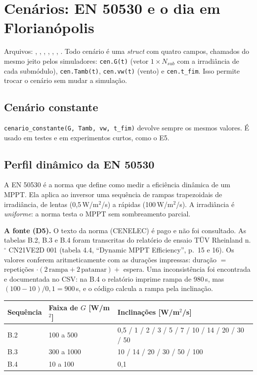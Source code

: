 \section{Cen\'arios: EN 50530 e o dia em Florian\'opolis}\label{sec:cenarios}

Arquivos: , , , , ,
, . Todo cen\'ario \'e uma \emph{struct} com quatro campos, chamados do mesmo jeito pelos simuladores:
\texttt{cen.G(t)} (vetor $1\times N_{sub}$ com a irradi\^ancia de cada subm\'odulo), \texttt{cen.Tamb(t)}, \texttt{cen.vw(t)} (vento) e \texttt{cen.t\_fim}. Isso permite trocar o cen\'ario sem mudar a simula\c{c}\~ao.

\subsection{Cen\'ario constante}

\texttt{cenario\_constante(G, Tamb, vw, t\_fim)} devolve sempre os mesmos valores. \'E usado em testes e em experimentos curtos, como o E5.

\subsection{Perfil din\^amico da EN 50530}

A EN 50530 \'e a norma que define como medir a efici\^encia din\^amica de um MPPT. Ela aplica ao inversor uma sequ\^encia de rampas trapezoidais de irradi\^ancia, de lentas
(0,5\,W/m$^2$/s) a r\'apidas (100\,W/m$^2$/s). A irradi\^ancia \'e \emph{uniforme}: a norma testa o MPPT sem sombreamento parcial.

\textbf{A fonte (D5).} O texto da norma (CENELEC) \'e pago e n\~ao foi consultado. As tabelas B.2, B.3 e B.4 foram transcritas do relat\'orio de ensaio T\"UV Rheinland
n.$^\circ$ CN21VE2D 001 (tabela 4.4, ``Dynamic MPPT Efficiency'', p.~15 e 16). Os valores conferem aritmeticamente com as dura\c{c}\~oes impressas:
dura\c{c}\~ao $=$ repeti\c{c}\~oes $\cdot(2\,\text{rampa}+2\,\text{patamar})+$ espera. Uma inconsist\^encia foi encontrada e documentada no CSV: na B.4 o relat\'orio imprime rampa de 980\,s, mas
$(100-10)/0{,}1=900$\,s, e o c\'odigo calcula a rampa pela inclina\c{c}\~ao.

\begin{center}\small
\begin{tabular}{@{}lll@{}}
\toprule
Sequ\^encia & Faixa de $G$ [W/m$^2$] & Inclina\c{c}\~oes [W/m$^2$/s] \\ \midrule
B.2 & 100 a 500 & 0,5 / 1 / 2 / 3 / 5 / 7 / 10 / 14 / 20 / 30 / 50 \\
B.3 & 300 a 1000 & 10 / 14 / 20 / 30 / 50 / 100 \\
B.4 & 10 a 100 & 0,1 \\
\bottomrule
\end{tabular}
\end{center}

